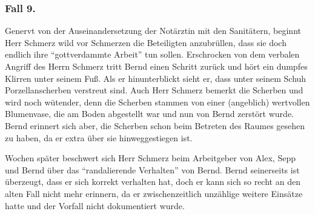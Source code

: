 

\subsubsection{Fall 9. }
\label{topic:jus-langer-dienst-fall-9}
\label{topic:dokumentationspflicht-fallbeispiel}


{Genervt von der Auseinandersetzung der Notärztin mit den
Sanitätern, beginnt Herr Schmerz wild vor Schmerzen die
Beteiligten anzubrüllen, dass sie doch endlich ihre
\enquote{gottverdammte Arbeit} tun sollen.
Erschrocken von dem verbalen Angriff des Herrn Schmerz tritt
Bernd einen Schritt zurück und hört ein dumpfes Klirren
unter seinem Fuß. Als er hinunterblickt sieht er, dass unter
seinem Schuh Porzellanscherben verstreut sind. Auch Herr
Schmerz bemerkt die Scherben und wird noch wütender, denn
die Scherben stammen von einer (angeblich) wertvollen
Blumenvase, die am Boden abgestellt war und nun von Bernd
zerstört wurde. Bernd erinnert sich aber, die Scherben schon
beim Betreten des Raumes gesehen zu haben, da er extra über
sie hinweggestiegen ist.

Wochen später beschwert sich Herr Schmerz beim
Arbeitgeber von Alex, Sepp und Bernd über das
\enquote{randalierende Verhalten} von Bernd. Bernd seinerseits ist
überzeugt, dass er sich korrekt verhalten hat, doch er kann sich so recht an den alten Fall nicht mehr
erinnern, da er zwischenzeitlich unzählige weitere
Einsätze hatte und der Vorfall nicht dokumentiert
wurde.}{}{}{}{}




~


